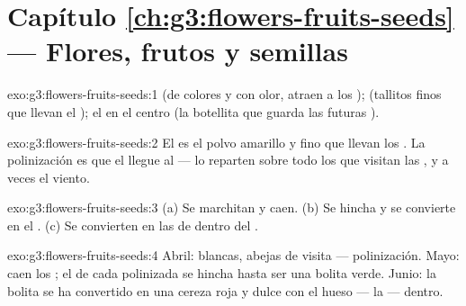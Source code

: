 \section*{Capítulo \ref{ch:g3:flowers-fruits-seeds} --- Flores, frutos y semillas}

\begin{solution}{exo:g3:flowers-fruits-seeds:1}
 (de colores y con olor, atraen a los ); 
(tallitos finos que llevan el ); el  en el centro (la
botellita que guarda las futuras ).
\end{solution}

\begin{solution}{exo:g3:flowers-fruits-seeds:2}
El  es el polvo amarillo y fino que llevan los . La
polinización es que el  llegue al  --- lo reparten sobre
todo los  que visitan las , y a veces el viento.
\end{solution}

\begin{solution}{exo:g3:flowers-fruits-seeds:3}
(a) Se marchitan y caen. (b) Se hincha y se convierte en el .
(c) Se convierten en las  de dentro del .
\end{solution}

\begin{solution}{exo:g3:flowers-fruits-seeds:4}
Abril:  blancas, abejas de visita --- polinización. Mayo: caen
los ; el  de cada  polinizada se hincha hasta ser
una bolita verde. Junio: la bolita se ha convertido en una cereza roja
y dulce con el hueso --- la  --- dentro.
\end{solution}

